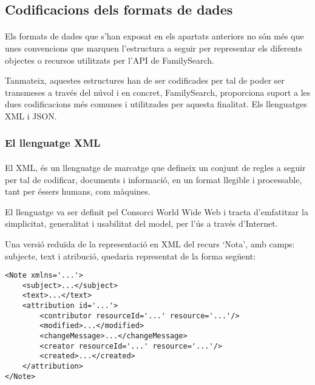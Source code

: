     \subsection{Codificacions dels formats de dades}

        \paragraph{}
        Els formats de dades que s’han exposat en els apartats anteriors no són més que unes convencions que marquen l'estructura a seguir per representar els diferents objectes o recursos utilitzats per l'API de FamilySearch.

        Tanmateix, aquestes estructures han de ser codificades per tal de poder ser transmeses a través del núvol i en concret, FamilySearch, proporciona suport a les dues codificacions més comunes i utilitzades per aquesta finalitat. Els llenguatges XML i JSON.


        \subsubsection{El llenguatge XML}

        \paragraph{}
        El \gls{XML}, és un llenguatge de marcatge que defineix un conjunt de regles a seguir per tal de codificar, documents i informació, en un format llegible i processable, tant per éssers humans, com màquines.

        El llenguatge va ser definit pel Consorci World Wide Web i tracta d’emfatitzar la simplicitat, generalitat i usabilitat del model, per l'ús a través d'Internet.

        Una versió reduïda de la representació en XML del recurs ‘Nota’, amb camps: subjecte, text i atribució, quedaria representat de la forma següent:

        \begin{lstlisting}[style=XML,caption={Representació bàsica en XML d'una Nota}]
<Note xmlns='...'>
    <subject>...</subject>
    <text>...</text>
    <attribution id='...'>
        <contributor resourceId='...' resource='...'/>
        <modified>...</modified>
        <changeMessage>...</changeMessage>
        <creator resourceId='...' resource='...'/>
        <created>...</created>
    </attribution>
</Note>
        \end{lstlisting}

